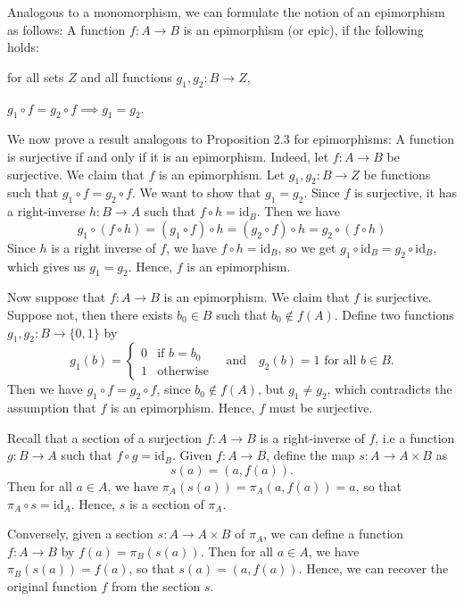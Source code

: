 \exercise Analogous to a monomorphism, we can formulate the notion of an epimorphism as follows: A function $f : A \to B$ is an epimorphism (or epic), if the following holds:

\begin{center}
    for all sets $Z$ and all functions $g_1, g_2 : B \to Z$,

    $g_1 \circ f = g_2 \circ f \implies g_1 = g_2$.
\end{center}

We now prove a result analogous to Proposition 2.3 for epimorphisms: A function is surjective if and only if it is an epimorphism. Indeed, let $f : A \to B$ be surjective. We claim that $f$ is an epimorphism. Let $g_1, g_2 : B \to Z$ be functions such that $g_1 \circ f = g_2 \circ f$. We want to show that $g_1 = g_2$. Since $f$ is surjective, it has a right-inverse $h : B \to A$ such that $f\circ h = \text{id}_B$. Then we have
\[g_1 \circ (f \circ h) = (g_1 \circ f) \circ h = (g_2 \circ f) \circ h = g_2 \circ (f \circ h)\]
Since $h$ is a right inverse of $f$, we have $f \circ h = \text{id}_B$, so we get $g_1 \circ \text{id}_B = g_2 \circ \text{id}_B$, which gives us $g_1 = g_2$. Hence, $f$ is an epimorphism.

Now suppose that $f : A \to B$ is an epimorphism. We claim that $f$ is surjective. Suppose not, then there exists $b_0 \in B$ such that $b_0 \not\in f(A)$. Define two functions $g_1, g_2 : B \to \{0,1\}$ by
\[g_1(b) = \begin{cases}
    0 & \text{if } b = b_0 \\
    1 & \text{otherwise}
\end{cases} \quad \text{and} \quad g_2(b) = 1 \text{ for all } b \in B.\]
Then we have $g_1 \circ f = g_2 \circ f$, since $b_0 \not\in f(A)$, but $g_1 \neq g_2$, which contradicts the assumption that $f$ is an epimorphism. Hence, $f$ must be surjective.

\exercise Recall that a section of a surjection $f : A \to B$ is a right-inverse of $f$, i.e a function $g : B \to A$ such that $f\circ g = \text{id}_B$. Given $f : A \to B$, define the map $s : A \to A \times B$ as
\[s(a) = (a, f(a)).\]
Then for all $a \in A$, we have $\pi_A(s(a)) = \pi_A(a, f(a)) = a$, so that $\pi_A \circ s = \text{id}_A$. Hence, $s$ is a section of $\pi_A$.

Conversely, given a section $s : A \to A \times B$ of $\pi_A$, we can define a function $f : A \to B$ by $f(a) = \pi_B(s(a))$. Then for all $a \in A$, we have $\pi_B(s(a)) = f(a)$, so that $s(a) = (a, f(a))$. Hence, we can recover the original function $f$ from the section $s$.

